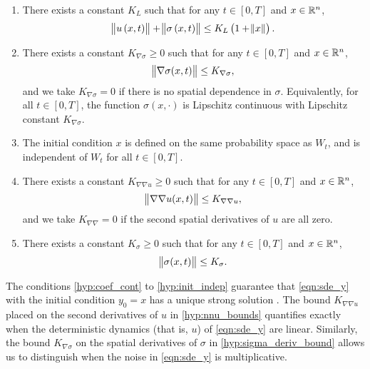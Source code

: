 \begin{hypo}
\begin{enumerate}[label=(H.\arabic{*}), ref=H.\arabic{*}]
		\item\label{hyp:linear_growth} There exists a constant \(K_L\) such that for any \(t \in [0,T]\) and \(x \in \mathbb{R}^n\),
		\[
			\norm{u\left(x,t\right)} + \norm{\sigma\left(x,t\right)} \leq K_L\left(1 + \norm{x}\right).
		\]

		\item\label{hyp:sigma_deriv_bound} There exists a constant \(K_{\nabla\sigma} \geq 0\) such that for any \(t \in [0,T]\) and \(x \in \mathbb{R}^n\),
		\begin{equation*}
			\norm{\nabla\sigma(x,t)} \leq K_{\nabla\sigma},
		\end{equation*}
		and we take \(K_{\nabla\sigma} = 0\) if there is no spatial dependence in \(\sigma\).
		Equivalently, for all \(t \in [0,T]\), the function \(\sigma\!\left(x, \cdot\right)\) is Lipschitz continuous with Lipschitz constant \(K_{\nabla\sigma}\).

		\item\label{hyp:init_indep} The initial condition \(x\) is defined on the same probability space as \(W_t\), and is independent of \(W_t\) for all \(t \in [0,T]\).

		\item\label{hyp:nnu_bounds} There exists a constant \(K_{\nabla\nabla u} \geq 0\) such that for any \(t \in [0,T]\) and \(x \in \mathbb{R}^n\),
		\[
			\norm{\nabla \nabla u(x,t)} \leq K_{\nabla\nabla u},
		\]
		and we take \(K_{\nabla\nabla} = 0\) if the second spatial derivatives of \(u\) are all zero.

		\item\label{hyp:sigma_bounds} There exists a constant \(K_\sigma \geq 0\) such that for any \(t \in [0,T]\) and \(x \in \mathbb{R}^n\),
		\begin{equation*}
			\norm{\sigma(x,t)} \leq K_{\sigma}.
		\end{equation*}

	\end{enumerate}
\end{hypo}
The conditions \ref{hyp:coef_cont} to \ref{hyp:init_indep} guarantee that \cref{eqn:sde_y} with the initial condition \(y_0 = x\) has a unique strong solution \cite{KallianpurSundar_2014_StochasticAnalysisDiffusion}.
The bound \(K_{\nabla\nabla u}\) placed on the second derivatives of \(u\) in \ref{hyp:nnu_bounds} quantifies exactly when the deterministic dynamics (that is, \(u\)) of \cref{eqn:sde_y} are linear.
Similarly, the bound \(K_{\nabla\sigma}\) on the spatial derivatives of \(\sigma\) in \ref{hyp:sigma_deriv_bound} allows us to distinguish when the noise in \cref{eqn:sde_y} is multiplicative.


